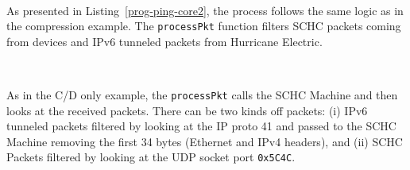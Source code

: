 ~

As presented in Listing~\vref{prog-ping-core2}, the process follows the same logic as in the compression example. 
The \texttt{processPkt} function filters SCHC packets coming from devices and IPv6 tunneled packets from Hurricane Electric. 

~

As in the C/D only example, the \texttt{processPkt} calls the SCHC Machine and then looks at the received packets. 
There can be two kinds off packets: (i) IPv6 tunneled packets filtered by looking at the IP proto 41 and passed to the SCHC Machine removing the first 34 bytes (Ethernet and IPv4 headers), and (ii) SCHC Packets filtered by looking at the UDP socket port \texttt{0x5C4C}.

~

